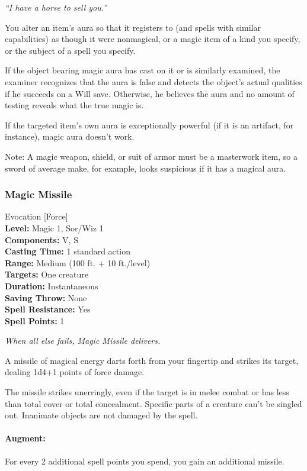 \emph{``I have a horse to sell you.''}

You alter an item's aura so that it registers to  (and spells with similar capabilities) as though it were nonmagical, or a magic item of a kind you specify, or the subject of a spell you specify.

If the object bearing magic aura has  cast on it or is similarly examined, 
the examiner recognizes that the aura is false and detects the object's actual qualities if he succeeds on a Will save. 
Otherwise, he believes the aura and no amount of testing reveals what the true magic is.

If the targeted item's own aura is exceptionally powerful (if it is an artifact, for instance), magic aura doesn't work.

Note: A magic weapon, shield, or suit of armor must be a masterwork item, so a sword of average make, for example, looks suspicious if it has a magical aura.
\subsubsection{Magic Missile}
\label{Spell:MagicMissile}
Evocation [Force]
\\ \textbf{Level:} Magic 1, Sor/Wiz 1
\\ \textbf{Components:} V, S
\\ \textbf{Casting Time:} 1 standard action
\\ \textbf{Range:} Medium (100 ft. + 10 ft./level)
\\ \textbf{Targets:} One creature
\\ \textbf{Duration:} Instantaneous
\\ \textbf{Saving Throw:} None
\\ \textbf{Spell Resistance:} Yes
\\ \textbf{Spell Points:} 1

\emph{When all else fails, Magic Missile delivers.}

A missile of magical energy darts forth from your fingertip and strikes its target, dealing 1d4+1 points of force damage.

The missile strikes unerringly, even if the target is in melee combat or has less than total cover or total concealment. 
Specific parts of a creature can't be singled out. Inanimate objects are not damaged by the spell.

\paragraph{Augment:} For every 2 additional spell points you spend, you gain an additional missile.

